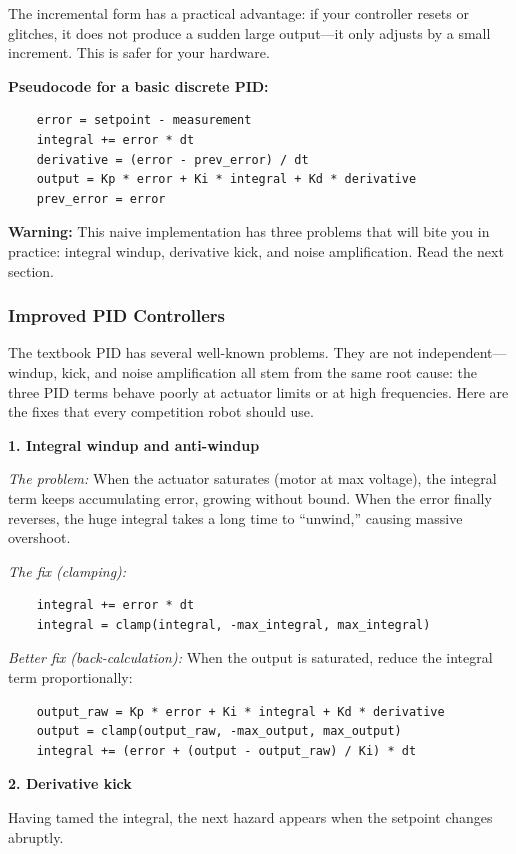 The incremental form has a practical advantage: if your controller resets or glitches, it does not produce a sudden large output---it only adjusts by a small increment. This is safer for your hardware.

\textbf{Pseudocode for a basic discrete PID:}
\begin{verbatim}
    error = setpoint - measurement
    integral += error * dt
    derivative = (error - prev_error) / dt
    output = Kp * error + Ki * integral + Kd * derivative
    prev_error = error
\end{verbatim}

\textbf{Warning:} This naive implementation has three problems that will bite you in practice: integral windup, derivative kick, and noise amplification. Read the next section.

\subsubsection{Improved PID Controllers}

The textbook PID has several well-known problems. They are not independent---windup, kick, and noise amplification all stem from the same root cause: the three PID terms behave poorly at actuator limits or at high frequencies. Here are the fixes that every competition robot should use.

\textbf{1. Integral windup and anti-windup}

\textit{The problem:} When the actuator saturates (motor at max voltage), the integral term keeps accumulating error, growing without bound. When the error finally reverses, the huge integral takes a long time to ``unwind,'' causing massive overshoot.

\textit{The fix (clamping):}
\begin{verbatim}
    integral += error * dt
    integral = clamp(integral, -max_integral, max_integral)
\end{verbatim}

\textit{Better fix (back-calculation):} When the output is saturated, reduce the integral term proportionally:
\begin{verbatim}
    output_raw = Kp * error + Ki * integral + Kd * derivative
    output = clamp(output_raw, -max_output, max_output)
    integral += (error + (output - output_raw) / Ki) * dt
\end{verbatim}

\textbf{2. Derivative kick}

Having tamed the integral, the next hazard appears when the setpoint changes abruptly.

